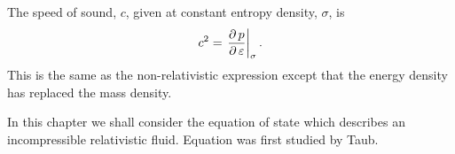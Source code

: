 The speed of sound, $c$,  given at constant entropy density, $\sigma$, is\cite{LandauBook,Taub1978} 
\begin{align}
  c^2 = \left.{\frac{\operatorname{\partial} p}{\operatorname{\partial} \varepsilon}}\right|_{\sigma}. \label{eqn:soundspeed}
\end{align}
This is the same as the non-relativistic expression except that the energy density has replaced the mass density.

In this chapter we shall consider the equation of state
which describes an incompressible relativistic fluid.
Equation  was first studied by Taub\cite{Taub1978}.




